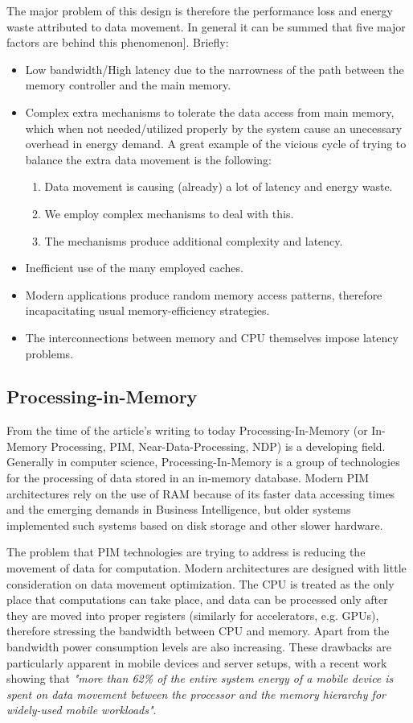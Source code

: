 \documentclass[12pt,twocolumn]{IEEEtran}
\begin{document}
The major problem of this design is therefore the performance loss and energy waste attributed to data movement. In general it can be summed that five major factors are behind this phenomenon]\cite{PAPER:1}. Briefly:
\begin{itemize}
	\item{Low bandwidth/High latency due to the narrowness of the path between the memory controller and the main memory.}
		\item{Complex extra mechanisms to tolerate the data access from main memory, which when not needed/utilized properly by the system cause an unecessary overhead in energy demand. A great example of the vicious cycle of trying to balance the extra data movement is the following:
	\begin{enumerate}
		\item{Data movement is causing (already) a lot of latency and energy waste.}
		\item{We employ complex mechanisms to deal with this.}
		\item{The mechanisms produce additional complexity and latency.}
	\end{enumerate}
	}
	\item{Inefficient use of the many employed caches.}
	\item{Modern applications produce random memory access patterns, therefore incapacitating usual memory-efficiency strategies.}	
	\item{The interconnections between memory and CPU themselves impose latency problems.}
\end{itemize}

\subsection{Processing-in-Memory}
From the time of the article's writing to today Processing-In-Memory (or In-Memory Processing, PIM, Near-Data-Processing, NDP)  is a developing field. Generally in computer science, Processing-In-Memory is a group of technologies for the processing of data stored in an in-memory database. Modern PIM architectures rely on the use of RAM because of its faster data accessing times and the emerging demands in Business Intelligence, but older systems implemented such systems based on disk storage and other slower hardware. 

The problem that PIM technologies are trying to address is reducing the movement of data for computation. Modern architectures are designed with little consideration on data movement optimization. The CPU is treated as the only place that computations can take place, and data can be processed only after they are moved into proper registers (similarly for accelerators, e.g. GPUs), therefore stressing the bandwidth between CPU and memory. Apart from the bandwidth power consumption levels are also increasing. These drawbacks are particularly apparent in mobile devices and server setups, with a recent work showing that \textit{"more than 62\% of the entire
system energy of a mobile device is spent on data movement between the processor and the memory hierarchy for widely-used mobile workloads"}\cite{ARTICLE:1, PAPER:1}.
\end{document}
